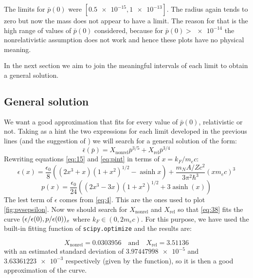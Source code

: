 \documentclass[a4paper]{article}
\DeclareMathOperator{\asinh}{asinh}
\begin{document}
The limits for $\bar{p}(0)$ were $[\num{0.5e-15}, \num{1e-13}]$. The radius again tends to zero but now the mass does not appear to have a limit. The reason for that is the high range of values of $\bar{p}(0)$ considered, because for $\bar{p}(0) > \num{e-14}$ the nonrelativistic assumption does not work and hence these plots have no physical meaning.

In the next section we aim to join the meaningful intervals of each limit to obtain a general solution.

\subsection{General solution} \label{subsec:solvinggeneral}

We want a good approximation that fits for every value of $\bar{p}(0)$, relativistic or not. Taking as a hint the two expressions for each limit developed in the previous lines (and the suggestion of \cite{silbarNeutronStarsUndergraduates2004}) we will search for a general solution of the form:
\begin{equation} \label{eq:38}
    \bar{\epsilon}(\bar{p}) = X_{\mathrm{nonrel}}\bar{p}^{3/5} + X_{\mathrm{rel}}\bar{p}^{3/4}
\end{equation}
Rewriting equations \eqref{eq:15} and \eqref{eq:pint} in terms of $x = k_F/m_e c$:
\begin{equation}
    \epsilon(x) = \frac{\epsilon_0}{8}((2x^3 + x)(1+x^2)^{1/2} - \asinh{x}) + \frac{m_N A/Z c^2}{3\pi^2 \hbar^3}(xm_ec)^3
\end{equation}
\begin{equation}
    p (x) = \frac{\epsilon_0}{24}((2x^3 - 3x)(1+x^2)^{1/2} + 3\asinh(x))
\end{equation}
The lest term of $\epsilon$ comes from \eqref{eq:4}. This are the ones used to plot \autoref{fig:pvsepsilon}. Now we should search for $X_{\mathrm{nonrel}}$ and $X_\mathrm{rel}$ so that \eqref{eq:38} fits the curve $(\epsilon/\epsilon(0),\space p/\epsilon(0))_x$ where $k_F \in (0, 2m_e c)$. For this purpose, we have used the built-in fitting function of \texttt{scipy.optimize} and the results are: 

\begin{equation} \label{eq:41}
    X_{\mathrm{nonrel}} = 0.0303956 \quad \mathrm{and} \quad  X_{\mathrm{rel}} = 3.51136
\end{equation}
with an estimated standard deviation of $\num{3.97447998e-5}$ and $\num{3.63361223e-3}$ respectively (given by the function), so it is then a good approximation of the curve.
\end{document}

